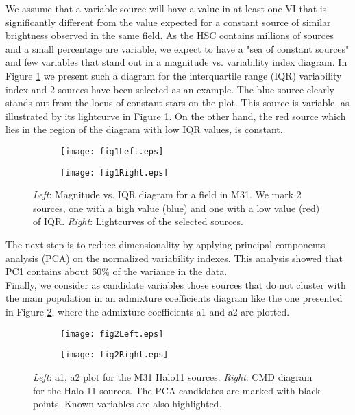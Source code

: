 \documentclass{iau}
\begin{document}
We assume that a variable source will have a value in at least one VI  that is significantly different from the value expected for a constant source of similar brightness observed in the same field.
 As the HSC contains millions of sources and a small percentage are variable, we expect to have a "sea of constant sources" and few variables that stand out in a magnitude vs. variability index diagram. In Figure \ref{fig:fig1} we present such a diagram for the interquartile range (IQR) variability index and 2 sources have been selected as an example.  The blue source clearly stands out from the locus of constant stars on the plot. This source is variable, as illustrated by its lightcurve in Figure \ref{fig:fig1}. On the other hand, the red source which lies in the region of the diagram with low IQR values, is constant.\\
%
\begin{figure}[h]
\begin{subfigure}{0.48\textwidth}
\begin{center}
 \texttt{[image: fig1Left.eps]} 
   \end{center}
  \end{subfigure}%
  \hfill
\begin{subfigure}{.48\textwidth}
\begin{center}
 \texttt{[image: fig1Right.eps]} 
\end{center}
\end{subfigure}%
\caption{ \textit{Left}: Magnitude vs. IQR diagram for a field in M31. We mark 2 sources, one with a high value (blue) and one with a low value (red) of IQR. \textit{Right}: Lightcurves of the selected sources.}
\label{fig:fig1}
\end{figure}
%
The next step is to reduce dimensionality by applying principal components analysis (PCA) on the normalized variability indexes.
This analysis showed that PC1 contains about 60\% of the variance in the data.\\
Finally, we consider as candidate variables those sources that do not cluster with the main population in an admixture coefficients diagram like the one presented in Figure \ref{fig:fig2}, where the admixture coefficients a1 and a2 are plotted.
%
\begin{figure}[h]
\begin{subfigure}{0.48\textwidth}
\begin{center}
  \texttt{[image: fig2Left.eps]} 
\end{center}
\end{subfigure}
\hfill
\begin{subfigure}{.48\textwidth}
\begin{center}
 \texttt{[image: fig2Right.eps]} 
\end{center}
\end{subfigure}%
\caption{ \textit{Left}: a1, a2 plot for the M31 Halo11 sources. 
\textit{Right}: CMD diagram for the Halo 11 sources. The PCA candidates are marked with black points. Known variables are also highlighted.}
\label{fig:fig2}
\end{figure}
\end{document}
